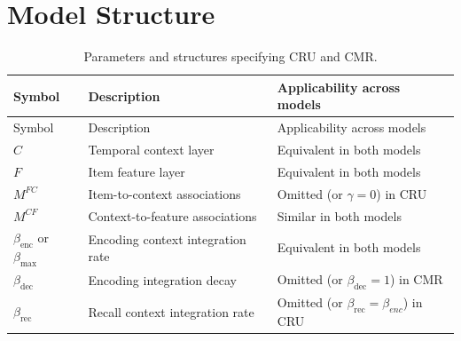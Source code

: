 \documentclass[
  letterpaper,
  DIV=11,
  numbers=noendperiod]{scrartcl}
\begin{document}
\section{Model Structure}\label{model-structure}

\begin{longtable}[]{@{}
  >{\raggedright\arraybackslash}p{}
  >{\raggedright\arraybackslash}p{}
  >{\raggedright\arraybackslash}p{}@{}}
\caption{Parameters and structures specifying CRU and
CMR.}\label{tbl-parameters}\tabularnewline
\toprule\noalign{}
\begin{minipage}[b]{\linewidth}\raggedright
Symbol
\end{minipage} & \begin{minipage}[b]{\linewidth}\raggedright
Description
\end{minipage} & \begin{minipage}[b]{\linewidth}\raggedright
Applicability across models
\end{minipage} \\
\midrule\noalign{}
\endfirsthead
\toprule\noalign{}
\begin{minipage}[b]{\linewidth}\raggedright
Symbol
\end{minipage} & \begin{minipage}[b]{\linewidth}\raggedright
Description
\end{minipage} & \begin{minipage}[b]{\linewidth}\raggedright
Applicability across models
\end{minipage} \\
\midrule\noalign{}
\endhead
\bottomrule\noalign{}
\endlastfoot
\(C\) & Temporal context layer & Equivalent in both models \\
\(F\) & Item feature layer & Equivalent in both models \\
\(M^{FC}\) & Item-to-context associations & Omitted (or \(\gamma=0\)) in
CRU \\
\(M^{CF}\) & Context-to-feature associations & Similar in both models \\
\(\beta_\text{enc}\) or \(\beta_\text{max}\) & Encoding context
integration rate & Equivalent in both models \\
\(\beta_\text{dec}\) & Encoding integration decay & Omitted (or
\(\beta_\text{dec}=1\)) in CMR \\
\(\beta_\text{rec}\) & Recall context integration rate & Omitted (or
\(\beta_\text{rec}=\beta_{enc}\)) in CRU \\

\end{longtable}
\end{document}
